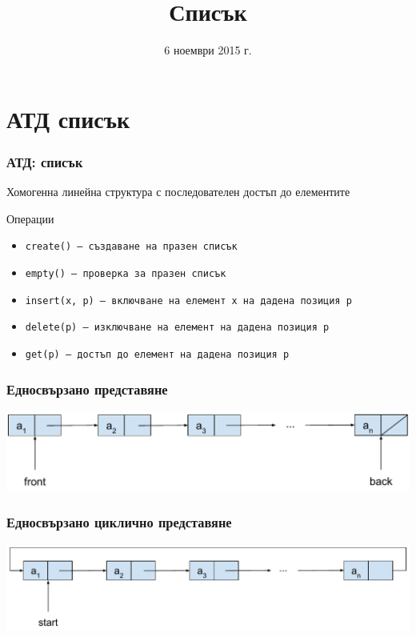 \documentclass{beamer}
\title{Списък}
\date{6 ноември 2015 г.}
\begin{document}
\begin{frame}
  \titlepage
\end{frame}

\section{АТД списък}

\begin{frame}
  \frametitle{АТД: списък}

  Хомогенна линейна структура с последователен достъп до елементите
  \vspace{1em}

  Операции
  \vspace{0.5em}
  \begin{itemize}
  \item \tt{create()} --- създаване на празен списък
  \item \tt{empty()} --- проверка за празен списък
  \item \tt{insert(x, p)} --- включване на елемент \tt x на дадена позиция \tt p
  \item \tt{delete(p)} --- изключване на елемент на дадена позиция \tt p
  \item \tt{get(p)} --- достъп до елемент на дадена позиция \tt p
  \end{itemize}
\end{frame}

\begin{frame}
  \frametitle{Едносвързано представяне}

  \begin{center}
    \includegraphics[width=\textwidth]{images/linked_list.pdf}
  \end{center}
\end{frame}

\begin{frame}
  \frametitle{Едносвързано циклично представяне}

  \begin{center}
    \includegraphics[width=\textwidth]{images/linked_cyclic_list.pdf}
  \end{center}
\end{frame}
\end{document}

